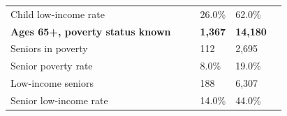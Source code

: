 \documentclass[9pt]{report}
\begin{document}
\begin{tabular}{p{.10in}p{.10in}p{.10in}p{3.7in}>{\hfill}p{.85in}>{\hfill}p{.85in}>{\hfill}p{.85in}>{\hfill}p{.85in}p{0.1in}}
\multicolumn{4}{l}{\parbox{3.6in}{\strut\raggedright{{Child low-income rate}}\strut}} &  &  & 26.0\% & 62.0\% & \multicolumn{1}{l}{}  \\ 
\multicolumn{4}{l}{\parbox{3.5in}{\strut\raggedright{\textbf{Ages 65+, poverty status known}\strut}}} & \textbf{} & \textbf{} & \textbf{1,367} & \textbf{14,180} & \textbf{} \\ 
\multicolumn{4}{l}{\parbox{3.6in}{\strut\raggedright{{Seniors in poverty}}\strut}} &  &  & 112 & 2,695 & \multicolumn{1}{l}{}  \\ 
\multicolumn{4}{l}{\parbox{3.6in}{\strut\raggedright{{Senior poverty rate}}\strut}} &  &  & 8.0\% & 19.0\% & \multicolumn{1}{l}{}  \\ 
\multicolumn{4}{l}{\parbox{3.6in}{\strut\raggedright{{Low-income seniors}}\strut}} &  &  & 188 & 6,307 & \multicolumn{1}{l}{}  \\ 
\multicolumn{4}{l}{\parbox{3.6in}{\strut\raggedright{{Senior low-income rate}}\strut}} &  &  & 14.0\% & 44.0\% & \multicolumn{1}{l}{}  \\ 

\end{tabular}
\setlength{\tabcolsep}{6pt} %
\end{document}
